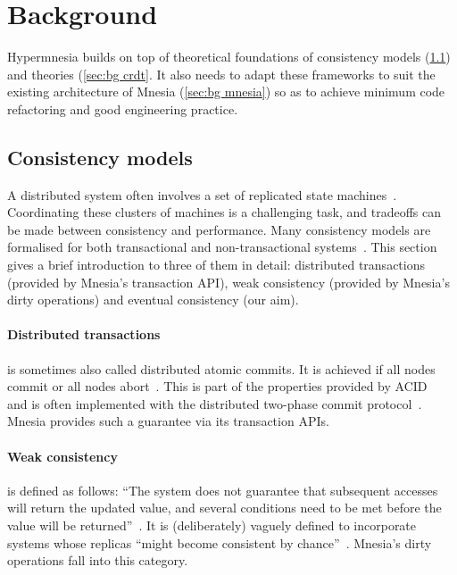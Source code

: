 \section{Background} \label{sec:bg}

Hypermnesia builds on top of theoretical foundations of consistency models
(\cref{sec:bg consistency models})
and  theories (\cref{sec:bg crdt}. It also needs to adapt these frameworks
to suit the existing architecture of Mnesia (\cref{sec:bg mnesia}) 
so as to achieve minimum code refactoring and good engineering practice.


\subsection{Consistency models} \label{sec:bg consistency models}

A distributed system often involves a set of replicated state 
machines~\cite{lamport1978clock}. Coordinating these clusters of machines is a 
challenging task, and tradeoffs can be
made between consistency and performance. Many consistency models are formalised for 
both transactional and non-transactional systems~\cite{viotti2016consistency}. 
This section gives a brief
introduction to three of them in detail: distributed transactions (provided by
Mnesia's transaction API), weak consistency (provided by Mnesia's dirty operations)
and eventual consistency (our aim).

\paragraph{Distributed transactions} is sometimes also called distributed atomic 
commits. It is achieved if all nodes commit
or all nodes abort~\cite{saltzer2009Principles}. This is part of the properties provided by 
ACID~\cite{haerder1983dbtransaction} and
is often implemented with the distributed two-phase commit protocol~\cite{bernstein1987concurrency}.
Mnesia provides such a guarantee via its transaction APIs.

\paragraph{Weak consistency}
is defined as follows:  
``The system does not guarantee that subsequent accesses will return the updated 
value, and several conditions need to be met before the value will be 
returned''~\cite{vogels2008ec,bermbach2013consistency,viotti2016consistency}.
It is (deliberately) vaguely defined to incorporate systems whose replicas
``might become consistent by chance''~\cite{bermbach2013consistency}. 
Mnesia's dirty operations fall into this category. 

